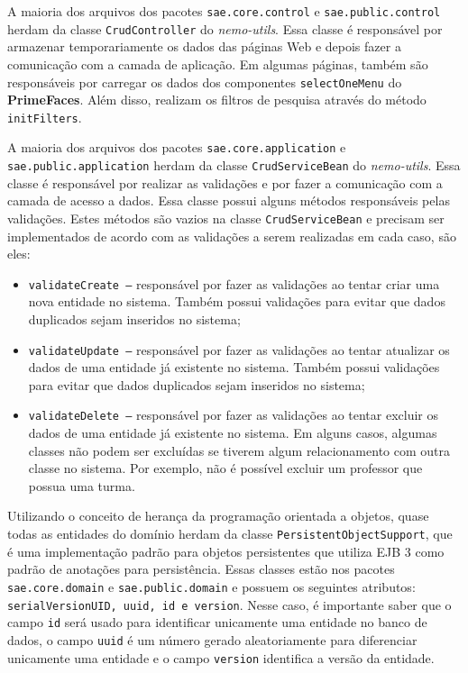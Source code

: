 A maioria dos arquivos dos pacotes \texttt{sae.core.control} e \texttt{sae.public.control}  herdam da classe \texttt{CrudController} do \textit{nemo-utils}. Essa classe é responsável por armazenar temporariamente os dados das páginas Web e depois fazer a comunicação com a camada de aplicação. Em algumas páginas, também são responsáveis por carregar os dados dos componentes \texttt{selectOneMenu} do \textbf{PrimeFaces}. Além disso, realizam os filtros de pesquisa através do método \texttt{initFilters}.


A maioria dos arquivos dos pacotes \texttt{sae.core.application} e \texttt{sae.public.appli\-cation} herdam da classe \texttt{CrudServiceBean} do \textit{nemo-utils}. Essa classe é responsável por realizar as validações e por fazer a comunicação com a camada de acesso a dados. Essa classe possui alguns métodos responsáveis pelas validações. Estes métodos são vazios na classe \texttt{CrudServiceBean} e precisam ser implementados de acordo com as validações a serem realizadas em cada caso, são eles:

\begin{itemize}	
	\item \texttt{validateCreate --} responsável por fazer as validações ao tentar criar uma nova entidade no sistema. Também possui validações para evitar que dados duplicados sejam inseridos no sistema;
	
	\item \texttt{validateUpdate --} responsável por fazer as validações ao tentar atualizar os dados de uma entidade já existente no sistema. Também possui validações para evitar que dados duplicados sejam inseridos no sistema;
	
	\item \texttt{validateDelete --} responsável por fazer as validações ao tentar excluir os dados de uma entidade já existente no sistema. Em alguns casos, algumas classes não podem ser excluídas se tiverem algum relacionamento com outra classe no sistema. Por exemplo, não é possível excluir um professor que possua uma turma.
\end{itemize}


Utilizando o conceito de herança da programação orientada a objetos, quase todas as entidades do domínio herdam da classe \texttt{PersistentObjectSupport}, que é uma implementação padrão para objetos persistentes que utiliza EJB 3 como padrão de anotações para persistência. Essas classes estão nos pacotes \texttt{sae.core.domain} e \texttt{sae.public.domain} e possuem os seguintes atributos: \texttt{serialVersionUID, uuid, id e version}. Nesse caso, é importante saber que o campo \texttt{id} será usado para identificar unicamente uma entidade no banco de dados, o campo \texttt{uuid} é um número gerado aleatoriamente para diferenciar unicamente uma entidade e o campo \texttt{version} identifica a versão da entidade.



